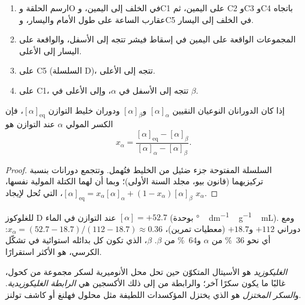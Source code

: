\begin{method}\label{met:b2:biomolecules:haworth}
\begin{enumerate}
  \item ارسم الحلقة وO في الخلف إلى اليمين، وC1 على اليمين، ثم C2 وC3 وC4 باتجاه عقارب الساعة على طول
        الأمام واليسار، وC5 في الخلف إلى اليسار.
  \item المجموعات الواقعة على اليمين في إسقاط فيشر تتجه إلى الأسفل، والواقعة على اليسار إلى الأعلى.
  \item على C5 (السلسلة D)، تتجه  إلى الأعلى.
  \item على C1، تتجه  إلى الأسفل في $\alpha$، وإلى الأعلى في $\beta$.
\end{enumerate}
\end{method}

\begin{proposition}\label{prop:b2:biomolecules:mutarotation}
إذا كان الدورانان النوعيان  النقيين $[\alpha]_\alpha$ و$[\alpha]_\beta$ ودوران
خليط التوازن $[\alpha]_{\mathrm{eq}}$، فإن الكسر المولي  $\alpha$ عند
التوازن هو
\begin{equation*}
x_\alpha = \frac{[\alpha]_{\mathrm{eq}} - [\alpha]_\beta}{[\alpha]_\alpha - [\alpha]_\beta}.
\end{equation*}
\end{proposition}

\begin{proof}
السلسلة المفتوحة جزء ضئيل من الخليط فتُهمل. وتتجمع دورانات 
بنسبة تركيزيهما (قانون بيو، مجلد السنة الأولى)؛ وبما أن لهما الكتلة المولية
نفسها، $[\alpha]_{\mathrm{eq}} = x_\alpha[\alpha]_\alpha + (1 - x_\alpha)[\alpha]_\beta$، التي تُحل
لإيجاد $x_\alpha$.
\end{proof}

للغلوكوز D عند التوازن في الماء $[\alpha] = +52.7$ (بوحدة \unit{\degree\,dm^{-1}\,g^{-1}\,mL}).
ومع دوراني  $+112$ و$+18.7$ (معطيات تمرين)، $x_\alpha = (52.7 - 18.7)/(112 - 18.7)
\approx 0.36$: أي نحو 36~\% من $\alpha$ و64~\% من $\beta$.  $\beta$، الذي تكون كل
بدائله استوائية في تشكّل الكرسي، هو الأكثر استقرارًا.

\begin{definition}[الغليكوزيدات]\label{def:b2:biomolecules:glycoside}
\emph{الغليكوزيد} هو الأسيتال المتكوّن حين تحل محل  الأنوميرية لسكر
مجموعة  من كحول، غالبًا ما يكون سكرًا آخر؛ والرابطة من  إلى ذلك
الأكسجين هي \emph{الرابطة الغليكوزيدية}. و\emph{السكر المختزل}
هو الذي يختزل المؤكسدات اللطيفة مثل محلول فهلنغ أو كاشف تولنز.
\end{definition}

